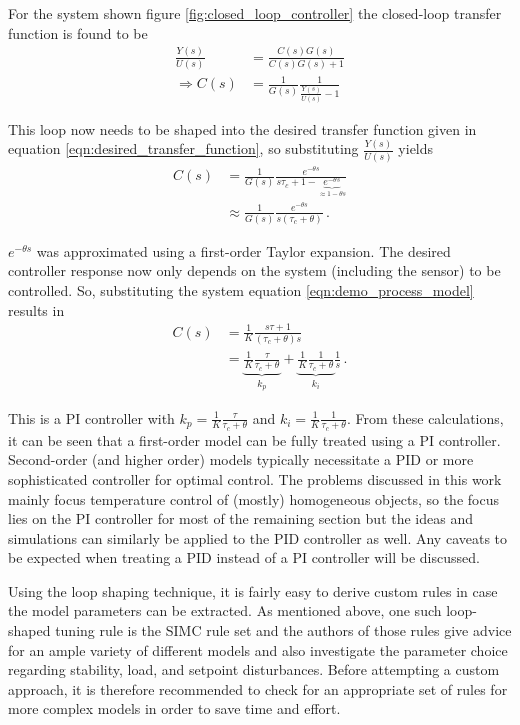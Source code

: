 For the system shown figure \ref{fig:closed_loop_controller} the closed-loop transfer function is found to be
\begin{align*}
    \frac{Y(s)}{U(s)} &= \frac{C(s) G(s)}{C(s) G(s) + 1} \\
    \Rightarrow C(s) &= \frac{1}{G(s)} \frac{1}{\frac{Y(s)}{U(s)} -1}
\end{align*}

This loop now needs to be shaped into the desired transfer function given in equation \ref{eqn:desired_transfer_function}, so substituting $\frac{Y(s)}{U(s)}$ yields
\begin{align}
    C(s) &= \frac{1}{G(s)} \frac{e^{-\theta s}}{s \tau_c +1 - \underbrace{e^{-\theta s}}_{\approx 1 - \theta s}}\\
    &\approx \frac{1}{G(s)} \frac{e^{-\theta s}}{s (\tau_c + \theta)} \,.
\end{align}

$e^{-\theta s}$ was approximated using a first-order Taylor expansion. The desired controller response now only depends on the system (including the sensor) to be controlled. So, substituting the system equation \ref{eqn:demo_process_model} results in
\begin{align}
    C(s) &= \frac{1}{K} \frac{s \tau + 1}{(\tau_c + \theta) s} \nonumber\\
    &= \underbrace{\frac{1}{K} \frac{\tau}{\tau_c + \theta}}_{k_p} + \underbrace{\frac{1}{K} \frac{1}{\tau_c + \theta}}_{k_i} \frac{1}{s}\,.
\end{align}

This is a PI controller with $k_p = \frac{1}{K} \frac{\tau}{\tau_c + \theta}$ and $k_i = \frac{1}{K} \frac{1}{\tau_c + \theta}$. From these calculations, it can be seen that a first-order model can be fully treated using a PI controller. Second-order (and higher order) models typically necessitate a PID or more sophisticated controller for optimal control. The problems discussed in this work mainly focus temperature control of (mostly) homogeneous objects, so the focus lies on the PI controller for most of the remaining section but the ideas and simulations can similarly be applied to the PID controller as well. Any caveats to be expected when treating a PID instead of a PI controller will be discussed.

Using the loop shaping technique, it is fairly easy to derive custom rules in case the model parameters can be extracted. As mentioned above, one such loop-shaped tuning rule is the SIMC rule set and the authors of those rules give advice for an ample variety of different models and also investigate the parameter choice regarding stability, load, and setpoint disturbances. Before attempting a custom approach, it is therefore recommended to check \cite{simc_paper} for an appropriate set of rules for more complex models in order to save time and effort.

